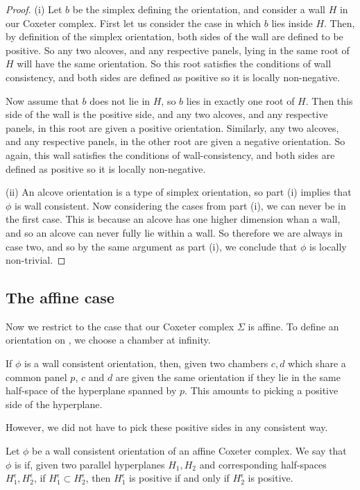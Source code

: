 \documentclass[11pt]{article}
\begin{document}
\begin{proof}
    (i) Let $b$ be the simplex defining the orientation, and consider a wall $H$ in our Coxeter complex. First let us consider the case in which $b$ lies inside $H$. Then, by definition of the simplex orientation, both sides of the wall are defined to be positive. So any two alcoves, and any respective panels, lying in the same root of $H$ will have the same orientation. So this root satisfies the conditions of wall consistency, and both sides are defined as positive so it is locally non-negative. 
    
    Now assume that $b$ does not lie in $H$, so $b$ lies in exactly one root of $H$. Then this side of the wall is the positive side, and any two alcoves, and any respective panels, in this root are given a positive orientation. Similarly, any two alcoves, and any respective panels, in the other root are given a negative orientation. So again, this wall satisfies the conditions of wall-consistency, and both sides are defined as positive so it is locally non-negative. 

    (ii) An alcove orientation is a type of simplex orientation, so part (i) implies that $\phi$ is wall consistent. Now considering the cases from part (i), we can never be in the first case. This is because an alcove has one higher dimension whan a wall, and so an alcove can never fully lie within a wall. So therefore we are always in case two, and so by the same argument as part (i), we conclude that $\phi$ is locally non-trivial. 
\end{proof}

\subsection{The affine case}

Now we restrict to the case that our Coxeter complex $\Sigma$ is affine. To define an orientation on \sg, we choose a chamber at infinity.

If $\phi$ is a wall consistent orientation, then, given two chambers $c,d$ which share a common panel $p$, $c$ and $d$ are given the same orientation if they lie in the same half-space of the hyperplane spanned by $p$. This amounts to picking a positive side of the hyperplane.

However, we did not have to pick these positive sides in any consistent way. 

\begin{definition}
    Let $\phi$ be a wall consistent orientation of an affine Coxeter complex. We say that $\phi$ is  if, given two parallel hyperplanes $H_1,H_2$ and corresponding half-spaces $H_1^{\epsilon},H_2^{\epsilon}$, if $H_1^{\epsilon}\subset H_2^{\epsilon}$, then $H_1^{\epsilon}$ is positive if and only if $H_2^{\epsilon}$ is positive. 
\end{definition}
\end{document}
